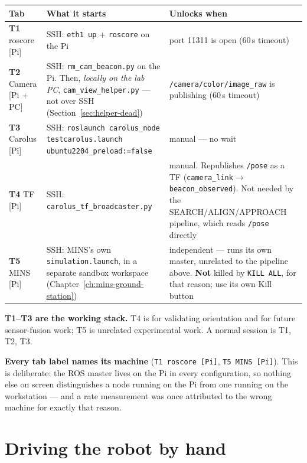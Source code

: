\documentclass[11pt]{report}
\begin{document}
\begin{center}
\begin{tabular}{p{}p{}p{}}
\toprule
Tab & What it starts & Unlocks when \\
\midrule
\textbf{T1} roscore [Pi]
 & SSH: \texttt{eth1 up} + \texttt{roscore} on the Pi
 & port 11311 is open (60\,s timeout) \\
\addlinespace
\textbf{T2} Camera [Pi + PC]
 & SSH: \texttt{rm\_cam\_beacon.py} on the Pi. Then, \emph{locally on the
   lab PC}, \texttt{cam\_view\_helper.py} --- not over SSH
   (Section~\ref{sec:helper-dead})
 & \texttt{/camera/color/image\_raw} is publishing (60\,s timeout) \\
\addlinespace
\textbf{T3} Carolus [Pi]
 & SSH: \texttt{roslaunch carolus\_node testcarolus.launch
   ubuntu2204\_preload:=false}
 & manual --- no wait \\
\addlinespace
\textbf{T4} TF [Pi]
 & SSH: \texttt{carolus\_tf\_broadcaster.py}
 & manual. Republishes \texttt{/pose} as a TF
   (\texttt{camera\_link}$\rightarrow$\texttt{beacon\_observed}). Not needed
   by the SEARCH/ALIGN/APPROACH pipeline, which reads \texttt{/pose}
   directly \\
\addlinespace
\textbf{T5} MINS [Pi]
 & SSH: MINS's own \texttt{simulation.launch}, in a separate sandbox
   workspace (Chapter~\ref{ch:mins-ground-station})
 & independent --- runs its own master, unrelated to the pipeline above.
   \textbf{Not} killed by \texttt{KILL ALL}, for that reason; use its own
   Kill button \\
\bottomrule
\end{tabular}
\end{center}

\textbf{T1--T3 are the working stack.} T4 is for validating orientation and
for future sensor-fusion work; T5 is unrelated experimental work. A normal
session is T1, T2, T3.

\textbf{Every tab label names its machine} (\texttt{T1 roscore [Pi]},
\texttt{T5 MINS [Pi]}). This is deliberate: the ROS master lives on the
Pi in every configuration, so nothing else on screen distinguishes a node
running on the Pi from one running on the workstation --- and a rate
measurement was once attributed to the wrong machine for exactly that
reason.

\section{Driving the robot by hand}
\end{document}
